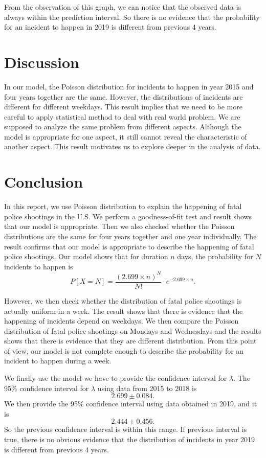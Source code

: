 \documentclass[11pt,a4paper,english]{article}
\begin{document}
From the observation of this graph, we can notice that the observed data is always within the prediction interval. So there is no evidence that the probability for an incident to happen in 2019 is different from previous 4 years.

\section{Discussion}
In our model, the Poisson distribution for incidents to happen in year 2015 and four years together are the same. However, the distributions of incidents are different for different weekdays.  This result implies that we need to be more careful to apply statistical method to deal with real world problem. We are supposed to analyze the same problem from different aspects. Although the model is appropriate for one aspect, it still cannot reveal the characteristic of another aspect. This result motivates us to explore deeper in the analysis of data.

\section{Conclusion}
In this report, we use Poisson distribution to explain the happening of fatal police shootings in the U.S. We perform a goodness-of-fit test and result shows that our model is appropriate. Then we also checked whether the Poisson distributions are the same for four years together and one year individually. The result confirms that our model is appropriate to describe the happening of fatal police shootings. Our model shows that for duration $n$ days, the probability for $N$ incidents to happen is 
\begin{equation*}
	P[X = N] = \frac{(2.699 \times n)^{N}}{N!}\cdot e^{-2.699 \times n}.
\end{equation*}

However, we then check whether the distribution of fatal police shootings is actually uniform in a week. The result shows that there is evidence that the happening of incidents depend on weekdays. We then compare the Poisson distribution of fatal police shootings on Mondays and Wednesdays and the results shows that there is evidence that they are different distribution. From this point of view, our model is not complete enough to describe the probability for an incident to happen during a week.

We finally use the model we have to provide the confidence interval for $\lambda$. The 95\% confidence interval for $\lambda$ using data from 2015 to 2018 is 
\[2.699 \pm 0.084.\]
We then provide the 95\% confidence interval using data obtained in 2019, and it is 
\[2.444 \pm 0.456.\]
So the previous confidence interval is within this range. If previous interval is true, there is no obvious evidence that the distribution of incidents in year 2019 is different from previous 4 years.
\end{document}
